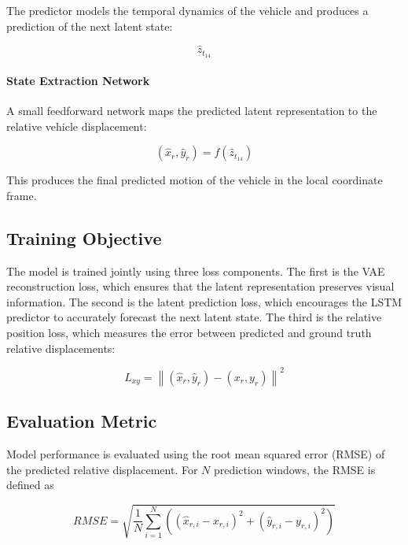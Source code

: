 \documentclass[preprint,12pt]{elsarticle}
\begin{document}
The predictor models the temporal dynamics of the vehicle and produces a prediction of the next latent state:

\begin{equation}
\hat{z}_{t_{14}}
\end{equation}

\paragraph{State Extraction Network}

A small feedforward network maps the predicted latent representation to the relative 
vehicle displacement:

\begin{equation}
(\hat{x}_r, \hat{y}_r) = f(\hat{z}_{t_{14}})
\end{equation}

This produces the final predicted motion of the vehicle in the local coordinate frame.

\subsection{Training Objective}

The model is trained jointly using three loss components. The first is the VAE reconstruction loss, which ensures that the latent representation preserves visual information. The second is the latent prediction loss, which encourages the LSTM predictor to accurately forecast the next latent state. The third is the relative position loss, which measures the error between predicted and ground truth 
relative displacements:

\begin{equation}
L_{xy} = \left\| (\hat{x}_r, \hat{y}_r) - (x_r, y_r) \right\|^2
\end{equation}

\subsection{Evaluation Metric}

Model performance is evaluated using the root mean squared error (RMSE) of the 
predicted relative displacement. For $N$ prediction windows, the RMSE is defined as

\begin{equation}
RMSE = \sqrt{\frac{1}{N} \sum_{i=1}^{N} \left((\hat{x}_{r,i} - x_{r,i})^2 + (\hat{y}_{r,i} - y_{r,i})^2\right)}
\end{equation}
\end{document}
